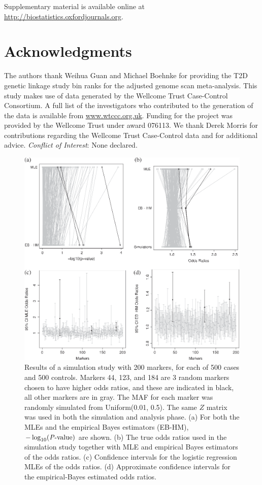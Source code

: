 \documentclass[oupdraft]{bio}
\begin{document}
Supplementary material is available online at
\href{http://biostatistics.oxfordjournals.org}%
{http://biostatistics.oxfordjournals.org}.


\section*{Acknowledgments}

The authors thank Weihua Guan and Michael Boehnke for providing
the T2D genetic linkage study bin ranks for the adjusted genome
scan meta-analysis. This study makes use of data generated by
the Wellcome Trust Case-Control Consortium. A full list of the
investigators who contributed to the generation of the data is
available from \href{www.wtccc.org.uk}{www.wtccc.org.uk}.
Funding for the project was provided by the Wellcome Trust
under award 076113. We thank Derek Morris for contributions
regarding the Wellcome Trust Case-Control data and for
additional advice.
{\it Conflict of Interest}: None declared.






\begin{figure}[!p]
\centering\includegraphics{fig1.eps}
\caption{Results of a simulation study with 200 markers,
for each of 500 cases and 500 controls. Markers 44, 123,
and 184 are 3 random markers chosen to have higher odds
ratios, and these are indicated in black, all other markers
are in gray. The MAF for each marker was randomly simulated
from Uniform(0.01, 0.5). The same $Z$ matrix was used in both
the simulation and analysis phase. (a) For both the MLEs
and the empirical Bayes estimators (EB-HM),
$-\log_{10} (\hbox{\textit{P}-value})$ are shown.
(b) The true odds ratios used in the simulation study
together with MLE and empirical Bayes estimators of the odds
ratios. (c) Confidence intervals for the logistic regression
MLEs of the odds ratios. (d) Approximate confidence intervals
for the empirical-Bayes estimated odds ratios.}
\label{Fig1}
\end{figure}
\end{document}
